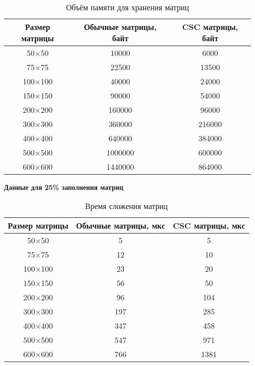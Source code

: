 \begin{table}[H]
	\centering
	\caption{Объём памяти для хранения матриц}
	\begin{tabular}{|c|c|c|}
		\hline
		Размер матрицы & Обычные матрицы, байт & CSC матрицы, байт \\ \hline
		50$\times$50         & 10000                 & 6000             \\ \hline
		75$\times$75         & 22500                 & 13500             \\ \hline
		100$\times$100        & 40000                 & 24000             \\ \hline
		150$\times$150        & 90000                 & 54000            \\ \hline
		200$\times$200        & 160000                & 96000            \\ \hline
		300$\times$300        & 360000                & 216000            \\ \hline
		400$\times$400        & 640000                & 384000           \\ \hline
		500$\times$500        & 1000000               & 600000           \\ \hline
		600$\times$600        & 1440000               & 864000           \\ \hline
	\end{tabular}
\end{table}

\newpage
\textbf{Данные для 25\% заполнения матриц}
\begin{table}[H]
	\centering
	\caption{Время сложения матриц}
	\begin{tabular}{|c|c|c|}
		\hline
		Размер матрицы & Обычные матрицы, мкс & CSC матрицы, мкс \\ \hline
		50$\times$50         & 5                    & 5                \\ \hline
		75$\times$75         & 12                   & 10                \\ \hline
		100$\times$100        & 23                   & 20                \\ \hline
		150$\times$150        & 56                   & 50               \\ \hline
		200$\times$200        & 96                   & 104               \\ \hline
		300$\times$300        & 197                  & 285               \\ \hline
		400$\times$400        & 347                  & 458              \\ \hline
		500$\times$500        & 547                  & 971              \\ \hline
		600$\times$600        & 766                  & 1381              \\ \hline
	\end{tabular}
\end{table}

